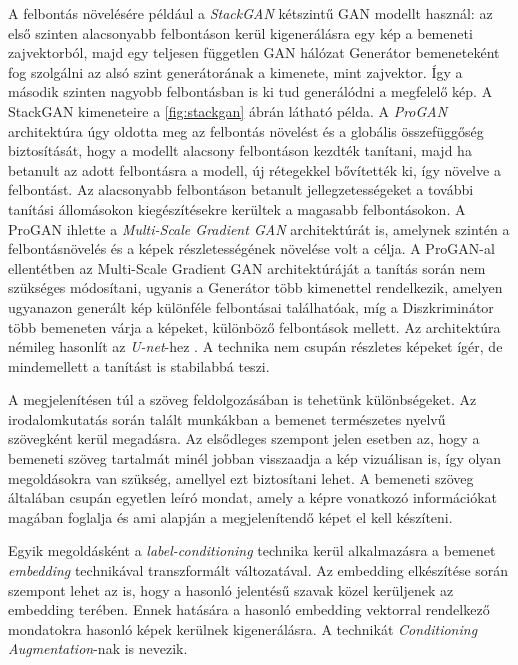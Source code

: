 A felbontás növelésére például a \textit{StackGAN} \cite{zhang2017stackgan} kétszintű GAN modellt használ: az első szinten alacsonyabb felbontáson kerül kigenerálásra egy kép a bemeneti zajvektorból, majd egy teljesen független GAN hálózat Generátor bemeneteként fog szolgálni az alsó szint generátorának a kimenete, mint zajvektor. Így a második szinten nagyobb felbontásban is ki tud generálódni a megfelelő kép. A StackGAN kimeneteire a \ref{fig:stackgan} ábrán látható példa.
A \textit{ProGAN} \cite{karras2017progressive} architektúra úgy oldotta meg az felbontás növelést és a globális összefüggőség biztosítását, hogy a modellt alacsony felbontáson kezdték tanítani, majd ha betanult az adott felbontásra a modell, új rétegekkel bővítették ki, így növelve a felbontást. Az alacsonyabb felbontáson betanult jellegzetességeket a további tanítási állomásokon kiegészítésekre kerültek a magasabb felbontásokon. A ProGAN ihlette a \textit{Multi-Scale Gradient GAN} \cite{karnewar2020msg} architektúrát is, amelynek szintén a felbontásnövelés és a képek részletességének növelése volt a célja. A ProGAN-al ellentétben az Multi-Scale Gradient GAN architektúráját a tanítás során nem szükséges módosítani, ugyanis a Generátor több kimenettel rendelkezik, amelyen ugyanazon generált kép különféle felbontásai találhatóak, míg a Diszkriminátor több bemeneten várja a képeket, különböző felbontások mellett. Az architektúra némileg hasonlít az \textit{U-net}-hez \cite{ronneberger2015u}. A technika nem csupán részletes képeket ígér, de mindemellett a tanítást is stabilabbá teszi.


A megjelenítésen túl a szöveg feldolgozásában is tehetünk különbségeket. Az irodalomkutatás során talált munkákban a bemenet természetes nyelvű szövegként kerül megadásra. Az elsődleges szempont jelen esetben az, hogy a bemeneti szöveg tartalmát minél jobban visszaadja a kép vizuálisan is, így olyan megoldásokra van szükség, amellyel ezt biztosítani lehet. A bemeneti szöveg általában csupán egyetlen leíró mondat, amely a képre vonatkozó információkat magában foglalja és ami alapján a megjelenítendő képet el kell készíteni.

Egyik megoldásként a \textit{label-conditioning} \cite{mirza2014conditional} technika kerül alkalmazásra a bemenet \textit{embedding} technikával transzformált változatával. Az embedding elkészítése során szempont lehet az is, hogy a hasonló jelentésű szavak közel kerüljenek az embedding terében. Ennek hatására a hasonló embedding vektorral rendelkező mondatokra hasonló képek kerülnek kigenerálásra. A technikát \textit{Conditioning Augmentation}-nak is nevezik. \cite{reed2016learning, zhang2017stackgan}

